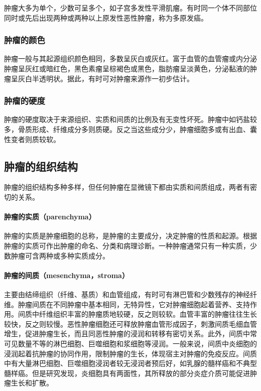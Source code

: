 肿瘤大多为单个，少数可呈多个，如子宫多发性平滑肌瘤。有时同一个体不同部位同时或先后出现两种或两种以上原发性恶性肿瘤，称为多原发癌。

\subsubsection{肿瘤的颜色}

肿瘤一般与其起源组织颜色相同，多数呈灰白或灰红。富于血管的血管瘤或内分泌肿瘤呈灰红或暗红色，黑色素瘤呈棕褐色或黑色，脂肪瘤呈淡黄色，分泌黏液的肿瘤呈灰白半透明状。据此，有时可对肿瘤来源作一初步估计。

\subsubsection{肿瘤的硬度}

肿瘤的硬度取决于来源组织、实质和间质的比例及有无变性坏死。肿瘤中如钙盐较多，骨质形成、纤维成分多则质硬。反之当这些成分少，肿瘤细胞多或有出血、囊性变者则质较软。

\subsection{肿瘤的组织结构}

肿瘤的组织结构多种多样，但任何肿瘤在显微镜下都由实质和间质组成，两者有密切的关系。

\paragraph{肿瘤的实质（parenchyma）}
肿瘤的实质是肿瘤细胞的总称，是肿瘤的主要成分，决定肿瘤的性质和起源。根据肿瘤的实质可作出肿瘤的命名、分类和病理诊断。一种肿瘤通常只有一种实质，少数肿瘤可含两种或多种实质成分。

\paragraph{肿瘤的间质（mesenchyma，stroma）}
主要由结缔组织（纤维、基质）和血管组成，有时可有淋巴管和少数残存的神经纤维。肿瘤间质在不同肿瘤中基本相同，无特异性，它对肿瘤细胞起着营养、支持作用。间质中纤维组织丰富的肿瘤质地较硬，反之则较软。血管丰富的肿瘤往往生长较快，反之则较慢。恶性肿瘤细胞还可释放肿瘤血管形成因子，刺激间质毛细血管增生，促进肿瘤生长，而且同恶性肿瘤的浸润和转移有密切关系。此外，间质中常可见数量不等的淋巴细胞、巨噬细胞和浆细胞等浸润。一般来说，间质中炎细胞的浸润起着抗肿瘤的协同作用，限制肿瘤的生长，体现宿主对肿瘤的免疫反应。间质中有大量淋巴细胞、巨噬细胞浸润者较无浸润者预后好，如乳腺的髓样癌和不典型髓样癌。但是研究发现，炎细胞具有两面性，其所释放的部分炎症介质可能促进肿瘤生长和扩散。

